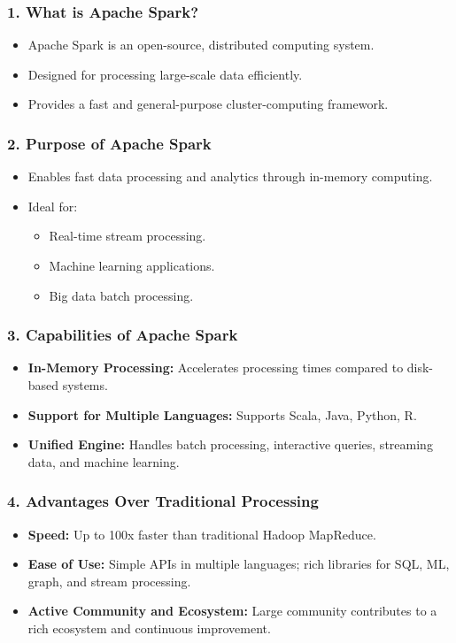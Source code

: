 \documentclass[aspectratio=169]{beamer}
\begin{document}
\begin{frame}[fragile]
    \frametitle{1. What is Apache Spark?}
    \begin{itemize}
        \item Apache Spark is an open-source, distributed computing system.
        \item Designed for processing large-scale data efficiently.
        \item Provides a fast and general-purpose cluster-computing framework.
    \end{itemize}
\end{frame}

\begin{frame}[fragile]
    \frametitle{2. Purpose of Apache Spark}
    \begin{itemize}
        \item Enables fast data processing and analytics through in-memory computing.
        \item Ideal for:
        \begin{itemize}
            \item Real-time stream processing.
            \item Machine learning applications.
            \item Big data batch processing.
        \end{itemize}
    \end{itemize}
\end{frame}

\begin{frame}[fragile]
    \frametitle{3. Capabilities of Apache Spark}
    \begin{itemize}
        \item \textbf{In-Memory Processing:} Accelerates processing times compared to disk-based systems.
        \item \textbf{Support for Multiple Languages:} Supports Scala, Java, Python, R.
        \item \textbf{Unified Engine:} Handles batch processing, interactive queries, streaming data, and machine learning.
    \end{itemize}
\end{frame}

\begin{frame}[fragile]
    \frametitle{4. Advantages Over Traditional Processing}
    \begin{itemize}
        \item \textbf{Speed:} Up to 100x faster than traditional Hadoop MapReduce.
        \item \textbf{Ease of Use:} Simple APIs in multiple languages; rich libraries for SQL, ML, graph, and stream processing.
        \item \textbf{Active Community and Ecosystem:} Large community contributes to a rich ecosystem and continuous improvement.
    \end{itemize}
\end{frame}
\end{document}
